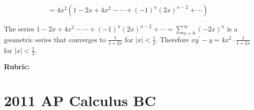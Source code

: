 \documentclass[12pt,addpoints,answers]{exam}
\begin{document}
\begin{questions}
\begin{solution}
\begin{parts}
\[=4 x^{2}\left(1-2 x+4 x^{2}-\cdots+(-1)^{n}(2 x)^{n-2}+\cdots\right)\]

The series $1-2 x+4 x^{2}-\cdots+(-1)^{n}(2 x)^{n-2}+\cdots=\sum_{n=0}^{\infty}(-2 x)^{n}$ is a geometric series that converges to $\frac{1}{1+2 x}$ for $|x|<\frac{1}{2}$. Therefore $x y^{\prime}-y=4 x^{2} \cdot \frac{1}{1+2 x}$ for $|x|<\frac{1}{2}$.
\end{parts}
\par\medskip
\textbf{Rubric:}\par
{}
\end{solution}

\end{questions}

\section*{2011 AP Calculus BC}
\end{document}
